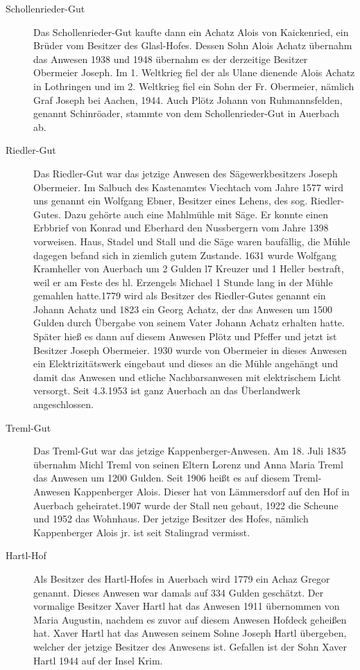 \documentclass[12pt,a4pager,draft]{book}
\begin{document}
\begin{description}
\item[Schollenrieder-Gut] Das Schollenrieder-Gut kaufte dann ein Achatz Alois
von Kaickenried, ein Brüder vom Besitzer des Glasl-Hofes. Dessen Sohn Alois
Achatz übernahm das Anwesen 1938 und 1948 übernahm es der derzeitige Besitzer
Obermeier Joseph. Im 1. Weltkrieg fiel der als Ulane dienende Alois Achatz in
Lothringen und im 2. Weltkrieg fiel ein Sohn der Fr. Obermeier, nämlich Graf
Joseph bei Aachen, 1944. Auch Plötz Johann von Ruhmannsfelden, genannt
Schinröader, stammte von dem Schollenrieder-Gut in Auerbach ab.

\item[Riedler-Gut] Das Riedler-Gut war das jetzige Anwesen des
Sägewerkbesitzers Joseph Obermeier. Im Salbuch des Kastenamtes Viechtach vom
Jahre 1577 wird uns genannt ein Wolfgang Ebner, Besitzer eines Lehens, des sog.
Riedler-Gutes. Dazu gehörte auch eine Mahlmühle mit Säge. Er konnte einen
Erbbrief von Konrad und Eberhard den Nussbergern vom Jahre 1398 vorweisen. Haus,
Stadel und Stall und die Säge waren baufällig, die Mühle dagegen befand sich in
ziemlich gutem Zustande. 1631 wurde Wolfgang Kramheller von Auerbach um 2 Gulden
l7 Kreuzer und 1 Heller bestraft, weil er am Feste des hl. Erzengels Michael 1
Stunde lang in der Mühle gemahlen hatte.1779 wird als Besitzer des Riedler-Gutes
genannt ein Johann Achatz und 1823 ein Georg Achatz, der das Anwesen um 1500
Gulden durch Übergabe von seinem Vater Johann Achatz erhalten hatte. Später hieß
es dann auf diesem Anwesen Plötz und Pfeffer und jetzt ist Besitzer Joseph
Obermeier. 1930 wurde von Obermeier in dieses Anwesen ein Elektrizitätswerk
eingebaut und dieses an die Mühle angehängt und damit das Anwesen und etliche
Nachbarsanwesen mit elektrischem Licht versorgt. Seit 4.3.1953 ist ganz Auerbach
an das Überlandwerk angeschlossen.

\item[Treml-Gut] Das Treml-Gut war das jetzige Kappenberger-Anwesen. Am 18.
Juli 1835 übernahm Michl Treml von seinen Eltern Lorenz und Anna Maria Treml das
Anwesen um 1200 Gulden. Seit 1906 heißt es auf diesem Treml-Anwesen Kappenberger
Alois. Dieser hat von Lämmersdorf auf den Hof in Auerbach geheiratet.1907 wurde
der Stall neu gebaut, 1922 die Scheune und 1952 das Wohnhaus. Der jetzige
Besitzer des Hofes, nämlich Kappenberger Alois jr. ist seit Stalingrad vermisst.

\item[Hartl-Hof] Als Besitzer des Hartl-Hofes in Auerbach wird 1779 ein Achaz
Gregor genannt. Dieses Anwesen war damals auf 334 Gulden geschätzt. Der
vormalige Besitzer Xaver Hartl hat das Anwesen 1911 übernommen von Maria
Augustin, nachdem es zuvor auf diesem Anwesen Hofdeck geheißen hat. Xaver Hartl
hat das Anwesen seinem Sohne Joseph Hartl übergeben, welcher der jetzige
Besitzer des Anwesens ist. Gefallen ist der Sohn Xaver Hartl 1944 auf der Insel
Krim.


\end{description}
\end{document}
